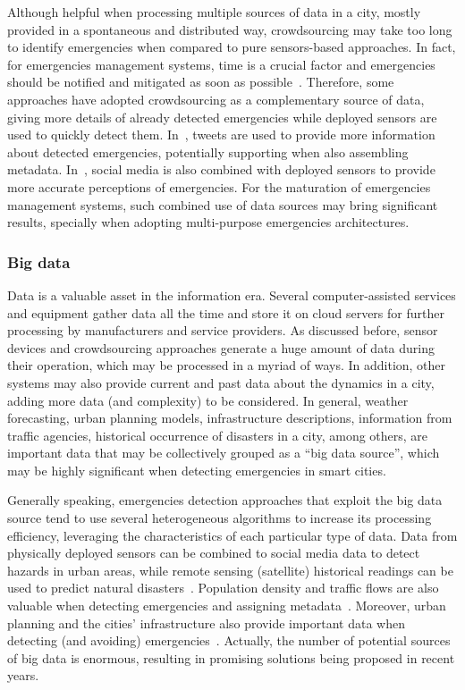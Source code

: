 \begin{refsection}
Although helpful when processing multiple sources of data in a city, mostly provided in a spontaneous and distributed way, crowdsourcing may take too long to identify emergencies when compared to pure sensors-based approaches. In fact, for emergencies management systems, time is a crucial factor and emergencies should be notified and mitigated as soon as possible~\cite{citiesdisasters6}. Therefore, some approaches have adopted crowdsourcing as a complementary source of data, giving more details of already detected emergencies while deployed sensors are used to quickly detect them. In~\cite{twitterDetection2}, tweets are used to provide more information about detected emergencies, potentially supporting when also assembling metadata. In~\cite{crowdsourcing3}, social media is also combined with deployed sensors to provide more accurate perceptions of emergencies. For the maturation of emergencies management systems, such combined use of data sources may bring significant results, specially when adopting multi-purpose emergencies architectures.  

\subsubsection{Big data}

Data is a valuable asset in the information era. Several computer-assisted services and equipment gather data all the time and store it on cloud servers for further processing by manufacturers and service providers. As discussed before, sensor devices and crowdsourcing approaches generate a huge amount of data during their operation, which may be processed in a myriad of ways. In addition, other systems may also provide current and past data about the dynamics in a city, adding more data (and complexity) to be considered. In general, weather forecasting, urban planning models, infrastructure descriptions, information from traffic agencies, historical occurrence of disasters in a city, among others, are important data that may be collectively grouped as a ``big data source'', which may be highly significant when detecting emergencies in smart cities. 

Generally speaking, emergencies detection approaches that exploit the big data source tend to use several heterogeneous algorithms to increase its processing efficiency, leveraging the characteristics of each particular type of data. Data from physically deployed sensors can be combined to social media data to detect hazards in urban areas, while remote sensing (satellite) historical readings can be used to predict natural disasters~\cite{satellite1,bigdata4}. Population density and traffic flows are also valuable when detecting emergencies and assigning metadata~\cite{population1}. Moreover, urban planning and the cities' infrastructure also provide important data when detecting (and avoiding) emergencies~\cite{urbanplanning1}. Actually, the number of potential sources of big data is enormous, resulting in promising solutions being proposed in recent years. 


\end{refsection}
